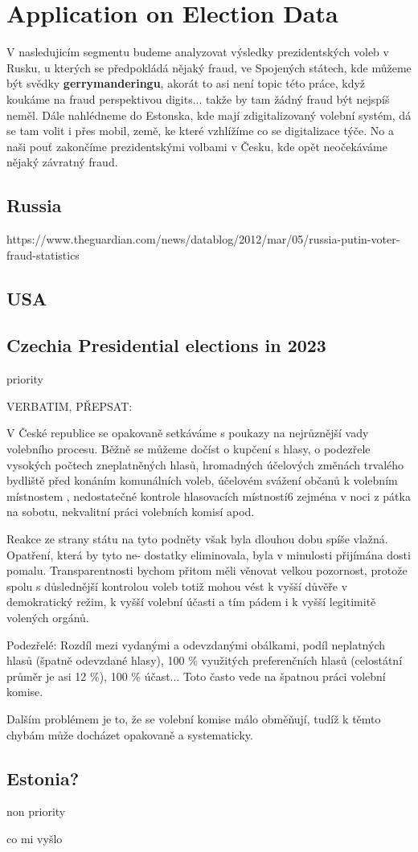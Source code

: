 \chapter{Application on Election Data} %

V nasledujicím segmentu budeme analyzovat výsledky prezidentských voleb v Rusku, u kterých se předpokládá nějaký fraud, ve Spojených státech, kde můžeme být svědky \textbf{gerrymanderingu}, akorát to asi není topic této práce, když koukáme na fraud perspektivou digits... takže by tam žádný fraud být nejspíš neměl. Dále nahlédneme do Estonska, kde mají zdigitalizovaný volební systém, dá se tam volit i přes mobil, země, ke které vzhlížíme co se digitalizace týče. No a naši pouť zakončíme prezidentskými volbami v Česku, kde opět neočekáváme nějaký závratný fraud.  


\section{Russia}
https://www.theguardian.com/news/datablog/2012/mar/05/russia-putin-voter-fraud-statistics


\section{USA} 


\section{Czechia Presidential elections in 2023}
priority 

\begin{koment}
VERBATIM, PŘEPSAT:

V České republice se opakovaně setkáváme s poukazy na nejrůznější vady volebního procesu. Běžně se můžeme dočíst o kupčení s hlasy, o podezřele vysokých počtech zneplatněných hlasů, hromadných účelových změnách trvalého bydliště před konáním komunálních voleb, účelovém svážení občanů k volebním místnostem , nedostatečné kontrole hlasovacích místností6 zejména v noci z pátka na
sobotu, nekvalitní práci volebních komisí apod. \cite{Lebeda2021}

Reakce ze strany
státu na tyto podněty však byla dlouhou dobu spíše vlažná. Opatření, která by tyto ne-
dostatky eliminovala, byla v minulosti přijímána dosti pomalu. Transparentnosti bychom přitom měli věnovat velkou pozornost, protože spolu s důslednější kontrolou voleb totiž mohou vést k vyšší důvěře v demokratický režim, k vyšší volební účasti a tím pádem i k vyšší
legitimitě volených orgánů. \cite{Lebeda2021}

Podezřelé: 
Rozdíl mezi vydanými a odevzdanými obálkami, podíl neplatných hlasů (špatně odevzdané hlasy), 100 \% využitých preferenčních hlasů (celostátní průměr je asi 12 \%), 100 \% účast... Toto často vede na špatnou práci volební komise. \cite{Lebeda2021}

Dalším problémem je to, že se volební komise málo obměňují, tudíž k těmto chybám může docházet opakovaně a systematicky. \cite{Lebeda2021}

\end{koment}



\section{Estonia?}
non priority 


co mi vyšlo 
